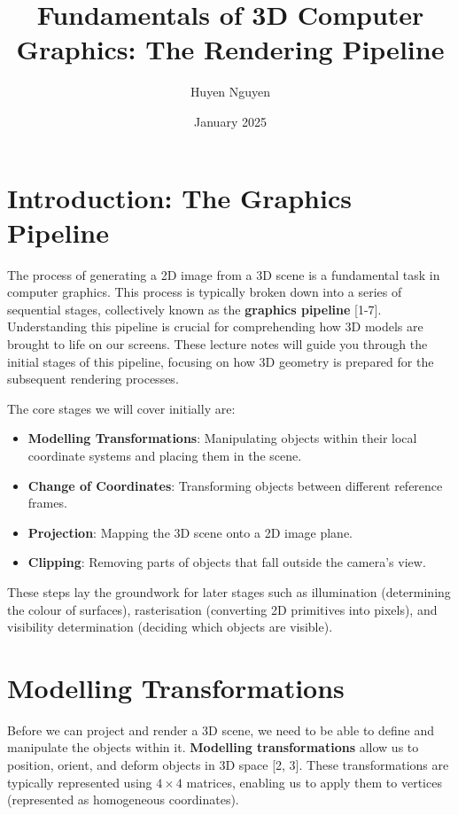 \documentclass[12pt]{article}
\title{Fundamentals of 3D Computer Graphics: The Rendering Pipeline}
\author{Huyen Nguyen}
\date{January 2025}
\begin{document}
\maketitle

\section{Introduction: The Graphics Pipeline}

The process of generating a 2D image from a 3D scene is a fundamental task in computer graphics. This process is typically broken down into a series of sequential stages, collectively known as the \textbf{graphics pipeline} [1-7]. Understanding this pipeline is crucial for comprehending how 3D models are brought to life on our screens. These lecture notes will guide you through the initial stages of this pipeline, focusing on how 3D geometry is prepared for the subsequent rendering processes.

The core stages we will cover initially are:

\begin{itemize}
    \item \textbf{Modelling Transformations}: Manipulating objects within their local coordinate systems and placing them in the scene.
    \item \textbf{Change of Coordinates}: Transforming objects between different reference frames.
    \item \textbf{Projection}: Mapping the 3D scene onto a 2D image plane.
    \item \textbf{Clipping}: Removing parts of objects that fall outside the camera's view.
\end{itemize}

These steps lay the groundwork for later stages such as illumination (determining the colour of surfaces), rasterisation (converting 2D primitives into pixels), and visibility determination (deciding which objects are visible).

\section{Modelling Transformations}

Before we can project and render a 3D scene, we need to be able to define and manipulate the objects within it. \textbf{Modelling transformations} allow us to position, orient, and deform objects in 3D space [2, 3]. These transformations are typically represented using $4 \times 4$ matrices, enabling us to apply them to vertices (represented as homogeneous coordinates).
\end{document}
